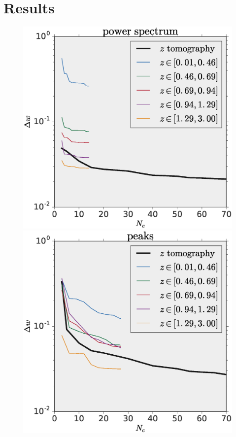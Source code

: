 \documentclass[reprint,aps,prd,superscriptaddress,showkeys,showpacs]{revtex4-1}
\begin{document}
\section{Results}
\label{sec:results}

\begin{figure}
\includegraphics[scale=0.3]{Figures/w_power_spectrum_pca.eps}
\includegraphics[scale=0.3]{Figures/w_peaks_pca.eps}

\end{figure}
\end{document}
